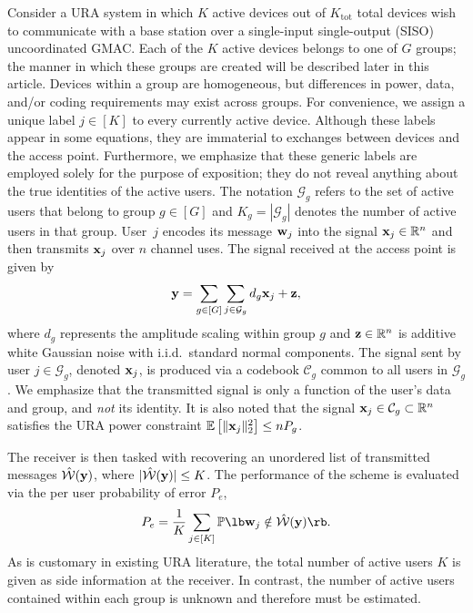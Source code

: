 \documentclass[journal]{IEEEtran}
\begin{document}
Consider a URA system in which $K$ active devices out of $K_{\mathrm{tot}}$ total devices wish to communicate with a base station over a single-input single-output (SISO) uncoordinated GMAC.
Each of the $K$ active devices belongs to one of $G$ groups; the manner in which these groups are created will be described later in this article. 
Devices within a group are homogeneous, but differences in power, data, and/or coding requirements may exist across groups.
For convenience, we assign a unique label $j \in [K]$ to every currently active device.
Although these labels appear in some equations, they are immaterial to exchanges between devices and the access point.
Furthermore, we emphasize that these generic labels are employed solely for the purpose of exposition; they do not reveal anything about the true identities of the active users.
The notation $\mathcal{G}_g$ refers to the set of active users that belong to group $g \in [G]$ and $K_g = |\mathcal{G}_g|$ denotes the number of active users in that group.
User~$j$ encodes its message $\mathbf{w}_j$ into the signal $\mathbf{x}_j \in \mathbb{R}^{n}$ and then transmits $\mathbf{x}_j$ over $n$ channel uses.
The signal received at the access point is given by
\begin{equation} \label{equation:URA_coded_demixing}
    \mathbf{y} = \sum_{g \in [G]}\sum_{j \in \mathcal{G}_g}d_g\mathbf{x}_j + \mathbf{z},
\end{equation}
where $d_g$ represents the amplitude scaling within group $g$ and $\mathbf{z} \in \mathbb{R}^n$ is additive white Gaussian noise with i.i.d.\ standard normal components. 
The signal sent by user $j \in \mathcal{G}_g$, denoted $\mathbf{x}_j$, is produced via a codebook $\mathcal{C}_g$ common to all users in $\mathcal{G}_g$.
We emphasize that the transmitted signal is only a function of the user's data and group, and \textit{not} its identity. 
It is also noted that the signal $\mathbf{x}_j \in \mathcal{C}_g \subset \mathbb{R}^n$ satisfies the URA power constraint $\mathbb{E} \left[ \| \mathbf{x}_j \|_2^2 \right] \leq nP_g$. 

The receiver is then tasked with recovering an unordered list of transmitted messages $\hat{\mathcal{W}}(\mathbf{y})$, where $|\hat{\mathcal{W}}(\mathbf{y})| \leq K$. 
The performance of the scheme is evaluated via the per user probability of error $P_e$,
\begin{equation}
    \label{eq:pupe}
    P_e = \frac{1}{K}\sum_{j \in [K]} \mathbb{P} 
    \lb \wv_j \notin \hat{\mathcal{W}}(\yv) \rb.
\end{equation}
As is customary in existing URA literature, the total number of active users $K$ is given as side information at the receiver.
In contrast, the number of active users contained within each group is unknown and therefore must be estimated.
\end{document}
